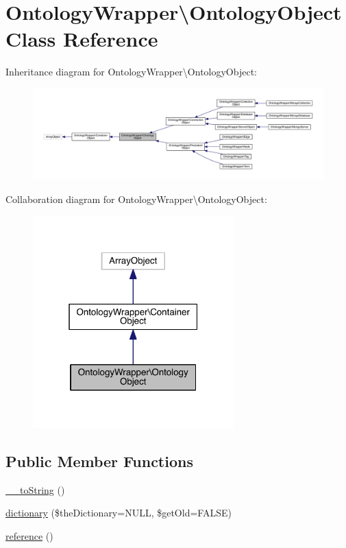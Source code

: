 \hypertarget{class_ontology_wrapper_1_1_ontology_object}{\section{Ontology\-Wrapper\textbackslash{}Ontology\-Object Class Reference}
\label{class_ontology_wrapper_1_1_ontology_object}
}


Inheritance diagram for Ontology\-Wrapper\textbackslash{}Ontology\-Object\-:
\nopagebreak
\begin{figure}[H]
\begin{center}
\leavevmode
\includegraphics[width=350pt]{class_ontology_wrapper_1_1_ontology_object__inherit__graph}
\end{center}
\end{figure}


Collaboration diagram for Ontology\-Wrapper\textbackslash{}Ontology\-Object\-:\nopagebreak
\begin{figure}[H]
\begin{center}
\leavevmode
\includegraphics[width=220pt]{class_ontology_wrapper_1_1_ontology_object__coll__graph}
\end{center}
\end{figure}
\subsection*{Public Member Functions}
\begin{DoxyCompactItemize}
\item 
\hyperlink{class_ontology_wrapper_1_1_ontology_object_aa3f8d87842ea2c3a50b3e760adb2224f}{\-\_\-\-\_\-to\-String} ()
\item 
\hyperlink{class_ontology_wrapper_1_1_ontology_object_a35bc67b94336aa801f20e495f3b0c3c2}{dictionary} (\$the\-Dictionary=N\-U\-L\-L, \$get\-Old=F\-A\-L\-S\-E)
\item 
\hyperlink{class_ontology_wrapper_1_1_ontology_object_a638db42a659f1e43a869312d5d85f991}{reference} ()
\end{DoxyCompactItemize}
